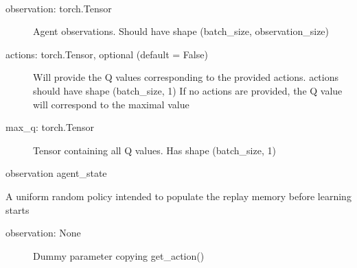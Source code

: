 \documentclass[letterpaper,10pt,english]{sphinxmanual}
\begin{document}
\begin{fulllineitems}
\begin{fulllineitems}
\label{\detokenize{MultiAgentMarketRL:agents.DQNAgent.get_q_value}}~\begin{description}
\item[{observation: torch.Tensor}] \leavevmode
\sphinxAtStartPar
Agent observations. Should have shape (batch\_size, observation\_size)

\item[{actions: torch.Tensor, optional (default = False)}] \leavevmode
\sphinxAtStartPar
Will provide the Q values corresponding to the provided actions.
actions should have shape (batch\_size, 1)
If no actions are provided, the Q value will correspond to the maximal value

\end{description}
\begin{description}
\item[{max\_q: torch.Tensor}] \leavevmode
\sphinxAtStartPar
Tensor containing all Q values. Has shape (batch\_size, 1)

\end{description}

\end{fulllineitems}


\begin{fulllineitems}
\label{\detokenize{MultiAgentMarketRL:agents.DQNAgent.get_target}}
\sphinxAtStartPar
observation
agent\_state

\end{fulllineitems}


\begin{fulllineitems}
\label{\detokenize{MultiAgentMarketRL:agents.DQNAgent.random_action}}
\sphinxAtStartPar
A uniform random policy intended to populate the replay memory before learning starts
\begin{description}
\item[{observation: None}] \leavevmode
\sphinxAtStartPar
Dummy parameter copying get\_action()


\end{description}
\end{fulllineitems}
\end{fulllineitems}
\end{document}
